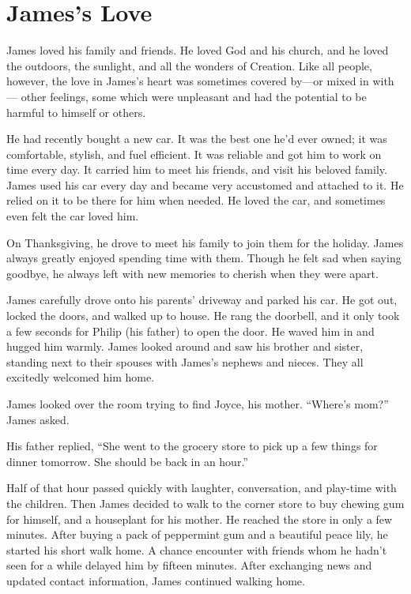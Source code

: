 \chapter{James's Love}

James loved his family and friends. He loved God and his church, and he loved the outdoors, the sunlight, and all the wonders of Creation. Like all people, however, the love in James's heart was sometimes covered by—or mixed in with— other feelings, some which were unpleasant and had the potential to be harmful to himself or others.

He had recently bought a new car. It was the best one he'd ever owned; it was comfortable, stylish, and fuel efficient. It was reliable and got him to work on time every day. It carried him to meet his friends, and visit his beloved family. James used his car every day and became very accustomed and attached to it. He relied on it to be there for him when needed. He loved the car, and sometimes even felt the car loved him.

On Thanksgiving, he drove to meet his family to join them for the holiday. James always greatly enjoyed spending time with them. Though he felt sad when saying goodbye, he always left with new memories to cherish when they were apart.

James carefully drove onto his parents' driveway and parked his car. He got out, locked the doors, and walked up to house. He rang the doorbell, and it only took a few seconds for Philip (his father) to open the door. He waved him in and hugged him warmly. James looked around and saw his brother and sister, standing next to their spouses with James's nephews and nieces. They all excitedly welcomed him home.

James looked over the room trying to find Joyce, his mother. “Where's mom?” James asked.

His father replied, “She went to the grocery store to pick up a few things for dinner tomorrow. She should be back in an hour.”

Half of that hour passed quickly with laughter, conversation, and play-time with the children. Then James decided to walk to the corner store to buy chewing gum for himself, and a houseplant for his mother. He reached the store in only a few minutes. After buying a pack of peppermint gum and a beautiful peace lily, he started his short walk home. A chance encounter with friends whom he hadn't seen for a while delayed him by fifteen minutes. After exchanging news and updated contact information, James continued walking home.

